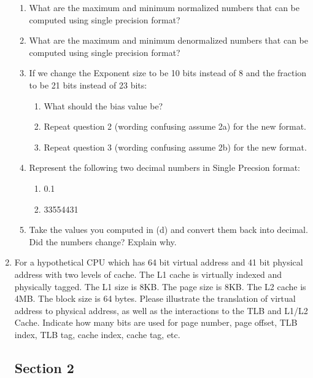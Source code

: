 \documentclass[main.tex]{subfiles}
\begin{document}
\begin{enumerate}
\begin{enumerate}
    \item What are the maximum and minimum normalized numbers that can be computed using single precision format?
    \item What are the maximum and minimum denormalized numbers that can be computed using single precision format?
    \item If we change the Exponent size to be 10 bits instead of 8 and the fraction to be 21 bits instead of 23 bits:
    \begin{enumerate}
        \item What should the bias value be?
        \item Repeat question 2 (wording confusing assume 2a) for the new format.
        \item Repeat question 3 (wording confusing assume 2b) for the new format.
    \end{enumerate}
    \item Represent the following two decimal numbers in Single Precsion format:
    \begin{enumerate}
        \item 0.1
        \item 33554431
    \end{enumerate}
    \item Take the values you computed in (d) and convert them back into decimal. Did the numbers change? Explain why.
\end{enumerate}

\item For a hypothetical CPU which has 64 bit virtual address and 41 bit physical address with two levels of cache. The L1 cache is virtually indexed and physically tagged. The L1 size is 8KB. The page size is 8KB. The L2 cache is 4MB. The block size is 64 bytes. Please illustrate the translation of virtual address to physical address, as well as the interactions to the TLB and L1/L2 Cache. Indicate how many bits are used for page number, page offset, TLB index, TLB tag, cache index, cache tag, etc.

\subsection{Section 2}


\end{enumerate}
\end{document}
